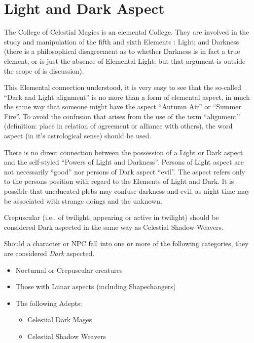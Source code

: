 \section{Light and Dark Aspect}

\begin{multicols}{3}

The College of Celestial Magics is an elemental College.  They are
involved in the study and manipulation of the fifth and sixth Elements
: Light; and Darkness (there is a philosophical disagreement as to
whether Darkness is in fact a true element, or is just the absence of
Elemental Light; but that argument is outside the scope of is
discussion).

This Elemental connection understood, it is very easy to see that the
so-called ``Dark and Light alignment'' is no more than a form of
elemental aspect, in much the same way that someone might have the
aspect ``Autumn Air'' or ``Summer Fire''.  To avoid the confusion that
arises from the use of the term ``alignment'' (definition: place in
relation of agreement or alliance with others), the word aspect (in
it's astrological sense) should be used.

There is no direct connection between the possession of a Light or
Dark aspect and the self-styled ``Powers of Light and Darkness''.
Persons of Light aspect are not necessarily ``good'' nor persons of Dark
aspect ``evil''.  The aspect refers only to the persons position with
regard to the Elements of Light and Dark.  It is possible that
uneducated plebs may confuse darkness and evil, as night time may be
associated with strange doings and the unknown.

Crepuscular (i.e., of twilight; appearing or active in twilight)
should be considered Dark aspected in the same way as Celestial Shadow
Weavers.

Should a character or NPC fall into one or more of the following
categories, they are considered \emph{Dark} aspected.
\begin{itemize}
\item Nocturnal or Crepuscular creatures
\item Those with Lunar aspects (including Shapechangers)
\item The following Adepts:
\begin{itemize}
\item Celestial Dark Mages
\item Celestial Shadow Weavers
\end{itemize}
\end{itemize}


\end{multicols}
